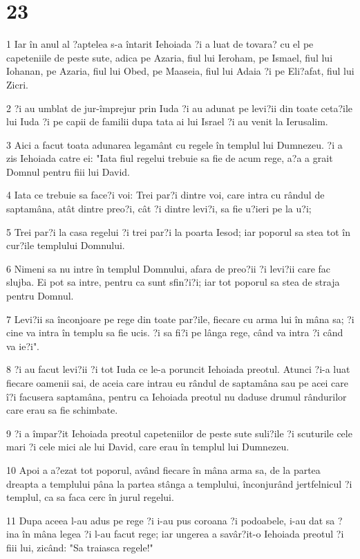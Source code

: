 \chapter{23}

\par 1 Iar în anul al ?aptelea s-a întarit Iehoiada ?i a luat de tovara? cu el pe capeteniile de peste sute, adica pe Azaria, fiul lui Ieroham, pe Ismael, fiul lui Iohanan, pe Azaria, fiul lui Obed, pe Maaseia, fiul lui Adaia ?i pe Eli?afat, fiul lui Zicri.
\par 2 ?i au umblat de jur-împrejur prin Iuda ?i au adunat pe levi?ii din toate ceta?ile lui Iuda ?i pe capii de familii dupa tata ai lui Israel ?i au venit la Ierusalim.
\par 3 Aici a facut toata adunarea legamânt cu regele în templul lui Dumnezeu. ?i a zis Iehoiada catre ei: "Iata fiul regelui trebuie sa fie de acum rege, a?a a grait Domnul pentru fiii lui David.
\par 4 Iata ce trebuie sa face?i voi: Trei par?i dintre voi, care intra cu rândul de saptamâna, atât dintre preo?i, cât ?i dintre levi?i, sa fie u?ieri pe la u?i;
\par 5 Trei par?i la casa regelui ?i trei par?i la poarta Iesod; iar poporul sa stea tot în cur?ile templului Domnului.
\par 6 Nimeni sa nu intre în templul Domnului, afara de preo?ii ?i levi?ii care fac slujba. Ei pot sa intre, pentru ca sunt sfin?i?i; iar tot poporul sa stea de straja pentru Domnul.
\par 7 Levi?ii sa înconjoare pe rege din toate par?ile, fiecare cu arma lui în mâna sa; ?i cine va intra în templu sa fie ucis. ?i sa fi?i pe lânga rege, când va intra ?i când va ie?i".
\par 8 ?i au facut levi?ii ?i tot Iuda ce le-a poruncit Iehoiada preotul. Atunci ?i-a luat fiecare oamenii sai, de aceia care intrau eu rândul de saptamâna sau pe acei care î?i facusera saptamâna, pentru ca Iehoiada preotul nu daduse drumul rândurilor care erau sa fie schimbate.
\par 9 ?i a împar?it Iehoiada preotul capeteniilor de peste sute suli?ile ?i scuturile cele mari ?i cele mici ale lui David, care erau în templul lui Dumnezeu.
\par 10 Apoi a a?ezat tot poporul, având fiecare în mâna arma sa, de la partea dreapta a templului pâna la partea stânga a templului, înconjurând jertfelnicul ?i templul, ca sa faca cerc în jurul regelui.
\par 11 Dupa aceea l-au adus pe rege ?i i-au pus coroana ?i podoabele, i-au dat sa ?ina în mâna legea ?i l-au facut rege; iar ungerea a savâr?it-o Iehoiada preotul ?i fiii lui, zicând: "Sa traiasca regele!"
